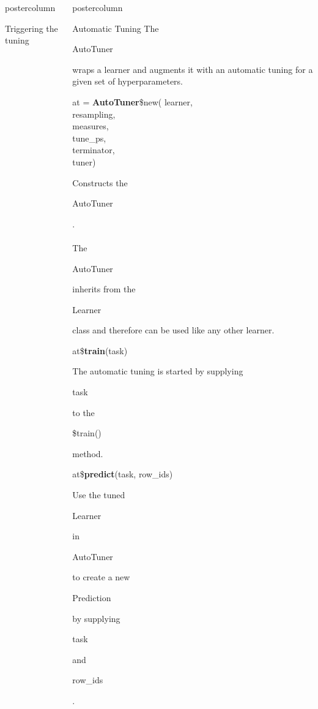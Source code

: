 \documentclass{beamer}
\newlength{\columnheight} %
\newcommand{\codeinline}[1]{\begin{codeboxinline}#1\end{codeboxinline}}
\begin{document}
\begin{frame}[fragile]{}
\begin{columns}
\begin{column}{.245\textwidth}
\begin{beamercolorbox}[center]{postercolumn}
\begin{minipage}{.98\textwidth}
{\begin{myblock}{Triggering the tuning}
						\end{myblock}
						\vfill}
				\end{minipage}
			\end{beamercolorbox}
		\end{column}
		\begin{column}{.245\textwidth}
			\begin{beamercolorbox}[center]{postercolumn}
				\begin{minipage}{.98\textwidth}
					\parbox[t][\columnheight]{\textwidth}{
						\begin{myblock}{Automatic Tuning}
							The \codeinline{AutoTuner} wraps a learner and augments it with an automatic tuning for a given set of hyperparameters.
							\\
							\begin{codeboxmultiline}[width=18cm]
								at = \textbf{AutoTuner}\$new(
								\hspace*{1ex}learner,\\
								\hspace*{1ex}resampling,\\
								\hspace*{1ex}measures,\\
								\hspace*{1ex}tune\_ps,\\
								\hspace*{1ex}terminator,\\
								\hspace*{1ex}tuner)
							\end{codeboxmultiline}
							Constructs the \codeinline{AutoTuner}.
							\\
							\\
							The \codeinline{AutoTuner} inherits from the \codeinline{Learner} class and therefore can be used like any other learner.
							\\
							\begin{codebox}
								at\$\textbf{train}(task)
							\end{codebox}
							The automatic tuning is started by supplying \codeinline{task} to the \codeinline{\$train()} method.
							\\
							\begin{codebox}
								at\$\textbf{predict}(task, row\_ids)
							\end{codebox}
							Use the tuned \codeinline{Learner} in \codeinline{AutoTuner} to create a new \codeinline{Prediction} by supplying \codeinline{task} and \codeinline{row\_ids}.
							\\

\end{myblock}}
\end{minipage}
\end{beamercolorbox}
\end{column}
\end{columns}
\end{frame}
\end{document}

